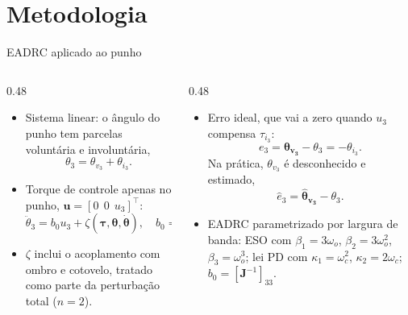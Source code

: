 \section{Metodologia}

\begin{frame}{EADRC aplicado ao punho}
  \begin{columns}[T]
    \begin{column}{0.48\textwidth}
      \begin{itemize}[<+->]
        \item Sistema linear: o ângulo do punho tem parcelas voluntária e involuntária,
          \begin{equation*}
            \theta_3 = \theta_{v_3} + \theta_{i_3}.
          \end{equation*}
        \item Torque de controle apenas no punho, $\mathbf{u} = [0\ \ 0\ \ u_3]^\top$:
          \begin{equation*}
            \ddot{\theta}_3 = b_0 u_3 + \zeta(\bm{\tau}, \bm{\theta}, \dot{\bm{\theta}}),
            \quad
            b_0 = \left[\mathbf{J}^{-1}\right]_{33}.
          \end{equation*}
        \item $\zeta$ inclui o acoplamento com ombro e cotovelo, tratado como parte da perturbação total ($n = 2$).
      \end{itemize}
    \end{column}
    \begin{column}{0.48\textwidth}
      \begin{itemize}[<+->]
        \item 
        Erro ideal, que vai a zero quando $u_3$ compensa $\tau_{i_3}$:
          \begin{equation*}
            e_3 = \bm{\theta_{v_3}} - \theta_3 = -\theta_{i_3}.
          \end{equation*}
        Na prática, $\theta_{v_3}$ é desconhecido e estimado,
          \begin{equation*}
            \hat{e}_3 = \bm{\hat{\theta}_{v_3}} - \theta_3.
          \end{equation*}
        \item EADRC parametrizado por largura de banda: ESO com $\beta_1 = 3\omega_o$, $\beta_2 = 3\omega_o^2$, $\beta_3 = \omega_o^3$; lei PD com $\kappa_1 = \omega_c^2$, $\kappa_2 = 2\omega_c$; $b_0 = [\mathbf{J}^{-1}]_{33}$.
    
      \end{itemize}
    \end{column}
  \end{columns}
\end{frame}

